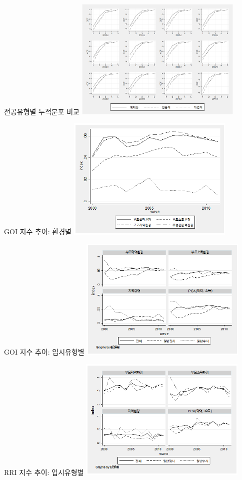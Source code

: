 \documentclass[aspectratio=169,xcolor=dvipsnames,handout]{beamer}
\begin{document}
\begin{frame}{전공유형별 누적분포 비교}
  \centering
  \includegraphics[width=0.6\textwidth]{figure/goms_cdf_bysex.png}
\end{frame}

\begin{frame}{GOI 지수 추이: 환경별}
  \centering
  \includegraphics[width=0.6\textwidth]{figure/goms_goi_byenv.png}
\end{frame}

\begin{frame}{GOI 지수 추이: 입시유형별}
  \centering
  \includegraphics[width=0.6\textwidth]{figure/goms_goi_byent.png}
\end{frame}

\begin{frame}{RRI 지수 추이: 입시유형별}
  \centering
  \includegraphics[width=0.6\textwidth]{figure/goms_rri_byent.png}
\end{frame}
\end{document}
